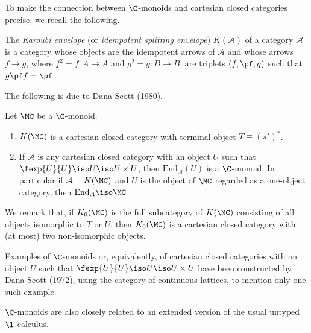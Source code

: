 To make the connection between $\C$-monoids and cartesian closed categories
precise, we recall the following.

\begin{defn}
The {\em Karoubi envelope} (or {\em idempotent splitting envelope})
$K(\mathcal A)$ of a category $\mathcal A$ is a category whose objects
are the idempotent arrows of $\mathcal A$ and whose arrows $f \to g$, where
$f^2 = f: A \to A$ and $g^2 = g: B \to B$, are triplets
$(f, \pf, g)$ such that $g\pf f = \pf$.
\end{defn}

The following is due to Dana Scott (1980).

\begin{thm}
Let $\MC$ be a $\C$-monoid.
\begin{enumerate}[label=(\roman*)]
\item $K(\MC)$ is a cartesian closed category  with terminal object
$T \equiv (\pi')^*$.
\item If $\mathcal A$ is any cartesian closed category with an object $U$
such that $\fexp{U}{U} \iso U \iso U \times U$, then $\text{End}_{\mathcal A}(U)$
is a $\C$-monoid. In particular if ${\mathcal A} = K(\MC)$
and $U$ is the object of $\MC$
regarded as a one-object category, then $\text{End}_{\mathcal A} \iso \MC$.
\end{enumerate}
\end{thm}

We remark that, if $K_0(\MC)$ is the full subcategory of $K(\MC)$ consisting
of all objects isomorphic to $T$ or $U$, then $K_0(\MC)$ is a cartesian closed
category with (at most) two non-isomorphic objects.

Examples of $\C$-monoids or, equivalently, of cartesian closed categories
with an object $U$ such that $\fexp{U}{U} \iso U \iso U \times U$
have been constructed by Dana Scott (1972), using the category of continuous
lattices, to mention only one such example.

$\C$-monoids are also closely related to an extended version of the usual
untyped $\l$-calculus.

